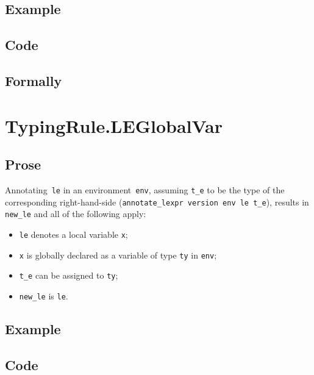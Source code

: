 \documentclass{book}
\begin{document}
  \subsection{Example}

  \subsection{Code}

\begin{emptyformal}
    \subsection{Formally}
\end{emptyformal}


\section{TypingRule.LEGlobalVar \label{sec:TypingRule.LEGlobalVar}}

  \subsection{Prose}
   Annotating~\texttt{le} in an environment~\texttt{env}, assuming
\texttt{t\_e} to be the type of the corresponding right-hand-side
(\texttt{annotate\_lexpr version env le t\_e}), results in \texttt{new\_le} and
all of the following apply:
   \begin{itemize}
   \item \texttt{le} denotes a local variable \texttt{x};
   \item \texttt{x} is globally declared as a variable of type \texttt{ty} in \texttt{env};
   \item \texttt{t\_e} can be assigned to \texttt{ty};
   \item \texttt{new\_le} is \texttt{le}.
   \end{itemize}

  \subsection{Example}

  \subsection{Code}
\end{document}
